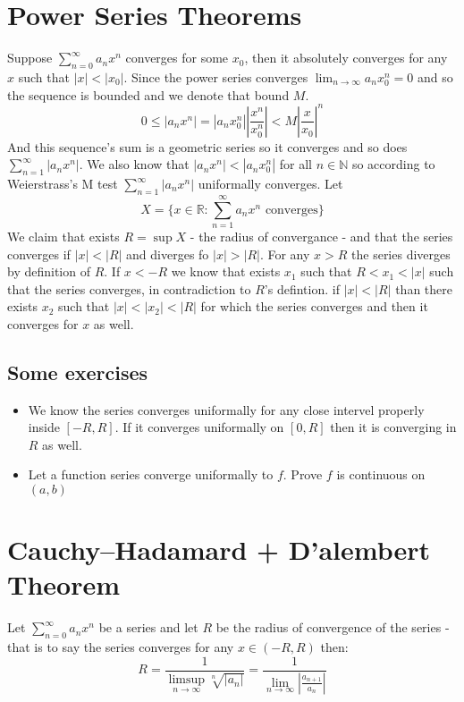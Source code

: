 \documentclass[11pt,a4paper]{article}
\theoremstyle{definition}
\theoremstyle{plain}
\newcommand{\N}{\mathbb{N}}
\newcommand{\R}{\mathbb{R}}
\begin{document}
	\newpage
	
	\section{Power Series Theorems}
	Suppose $\sum_{n=0}^\infty a_nx^n$ converges for some $x_0$, 
	then it absolutely converges for any $x$ such that $|x|<|x_0|$.
	Since the power series converges $\lim_{n\to\infty}{a_nx_0^n}=0$ 
	and so the sequence is bounded 
	and we denote that bound $M$.
	\[
		0 \le |a_nx^n| 
		= |a_nx_0^n|\left|\frac{x^n}{x_0^n}\right| 
		< M\left|\frac{x}{x_0}\right|^n
	\]
	And this sequence's sum is a geometric series so it converges and so does 
	$\sum_{n=1}^\infty|a_nx^n|$. 
	We also know that $|a_nx^n| < |a_nx_0^n|$ for all $n\in\N$ so according to 
	Weierstrass's M test $\sum_{n=1}^\infty|a_nx^n|$ uniformally converges. 
	Let
	\[
		X = \{x\in\R \colon \sum_{n=1}^\infty{a_nx^n}\text{ converges}\}
	\]
	We claim that exists $R = \sup X$ - the radius of convergance - 
	and that the series converges if $|x|<|R|$ and diverges fo $|x|>|R|$. 
	For any $x>R$ the series diverges by definition of $R$. 
	If $x < -R$ we know that exists $x_1$ such that $R < x_1 < |x|$ such that 
	the series converges, in contradiction to $R$'s defintion. 
	if $|x|<|R|$ than there exists $x_2$ such that $|x|<|x_2|<|R|$ 
	for which the series converges and then it converges for $x$ as well.
	
	\subsection{Some exercises}
	\begin{itemize}
		\item We know the series converges uniformally for any close intervel 
		properly inside $[-R,R]$.
	If it converges uniformally on $[0,R]$ then it is converging in $R$ as well.
		\item Let a function series converge uniformally to $f$. 
		Prove $f$ is continuous on $(a,b)$
	\end{itemize}
	
	\newpage
	
	\section{Cauchy–Hadamard + D'alembert Theorem}
	Let $\sum_{n=0}^{\infty}{a_nx^n}$ be a series and 
	let $R$ be the radius of convergence of the series - 
	that is to say the series converges for any $x\in(-R,R)$ 
	then:
	\[
		R = \frac{1}{\limsup_{n\to\infty}{\sqrt[n]{|a_n|}}}
		  = \frac{1}{\lim_{n\to\infty}{\left|\frac{a_{n+1}}
		  {a_n}\right|}}
	\]
	
\end{document}
